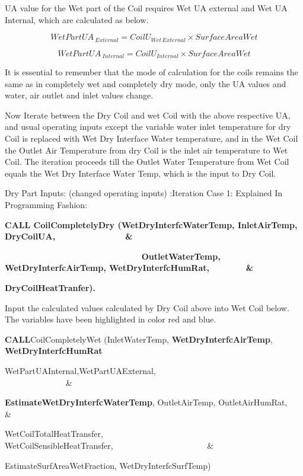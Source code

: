 UA value for the Wet part of the Coil requires Wet UA external and Wet UA Internal, which are calculated as below.

\begin{equation}
WetPartUA{\,_{External}} = Coil{U_{Wet\,External}} \times SurfaceAreaWet
\end{equation}

\begin{equation}
WetPartUA{\,_{Internal}} = Coil{U_{Internal}} \times SurfaceAreaWet
\end{equation}

It is essential to remember that the mode of calculation for the coils remains the same as in completely wet and completely dry mode, only the UA values and water, air outlet and inlet values change.

Now Iterate between the Dry Coil and wet Coil with the above respective UA, and usual operating inputs except the variable water inlet temperature for dry Coil is replaced with Wet Dry Interface Water temperature, and in the Wet Coil the Outlet Air Temperature from dry Coil is the inlet air temperature to Wet Coil. The iteration proceeds till the Outlet Water Temperature from Wet Coil equals the Wet Dry Interface Water Temp, which is the input to Dry Coil.

Dry Part Inputs: (changed operating inputs) :Iteration Case 1: Explained In Programming Fashion:

\textbf{CALL CoilCompletelyDry (WetDryInterfcWaterTemp, InletAirTemp, DryCoilUA,~~~~~~~~~~~~~~ \&}

\textbf{~~~~~~~~~~~~~~~~~~~~~~~~~~~~ OutletWaterTemp, WetDryInterfcAirTemp, WetDryInterfcHumRat,~~~~~~~ \&}

\textbf{DryCoilHeatTranfer).}

Input the calculated values calculated by Dry Coil above into Wet Coil below. The variables have been highlighted in color red and blue.

\textbf{CALL}CoilCompletelyWet (InletWaterTemp, \textbf{WetDryInterfcAirTemp}, \textbf{WetDryInterfcHumRat}

WetPartUAInternal,WetPartUAExternal,~~~~~~~~~~~~~~~~~~~~~~~~~~~~~~~~~~~~~~~~~~~~~~~~~ \&

\textbf{EstimateWetDryInterfcWaterTemp}, OutletAirTemp, OutletAirHumRat,~~~ \&

WetCoilTotalHeatTransfer, WetCoilSensibleHeatTransfer,~~~~~~~~~~~~~~~~~~~~~~ \&

EstimateSurfAreaWetFraction, WetDryInterfcSurfTemp)

